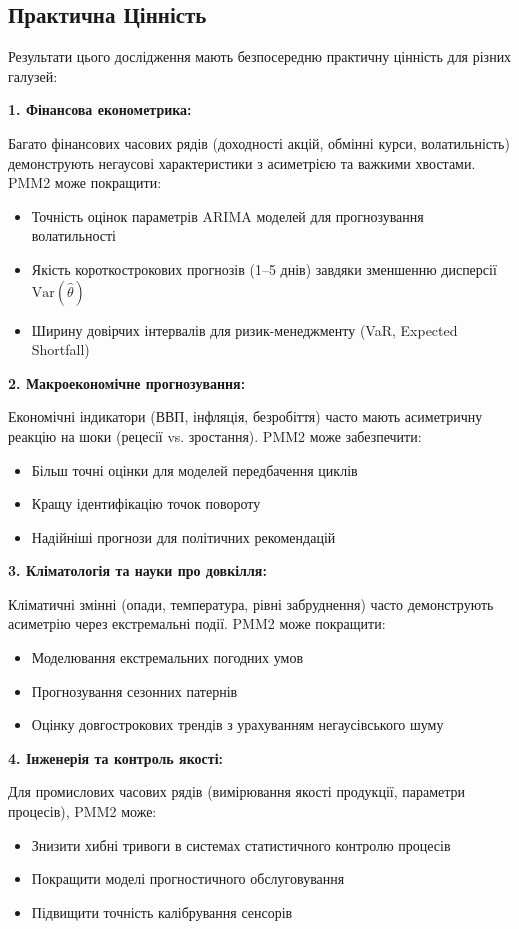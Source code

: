 \documentclass[12pt,a4paper]{article}
\begin{document}
\subsection{Практична Цінність}
\label{subsec:practical_value}

Результати цього дослідження мають безпосередню практичну цінність для різних галузей:

\textbf{1. Фінансова економетрика:}

Багато фінансових часових рядів (доходності акцій, обмінні курси, волатильність) демонструють негаусові характеристики з асиметрією та важкими хвостами. PMM2 може покращити:
\begin{itemize}
    \item Точність оцінок параметрів ARIMA моделей для прогнозування волатильності
    \item Якість короткострокових прогнозів (1--5 днів) завдяки зменшенню дисперсії $\text{Var}(\hat{\theta})$
    \item Ширину довірчих інтервалів для ризик-менеджменту (VaR, Expected Shortfall)
\end{itemize}

\textbf{2. Макроекономічне прогнозування:}

Економічні індикатори (ВВП, інфляція, безробіття) часто мають асиметричну реакцію на шоки (рецесії vs. зростання). PMM2 може забезпечити:
\begin{itemize}
    \item Більш точні оцінки для моделей передбачення циклів
    \item Кращу ідентифікацію точок повороту
    \item Надійніші прогнози для політичних рекомендацій
\end{itemize}

\textbf{3. Кліматологія та науки про довкілля:}

Кліматичні змінні (опади, температура, рівні забруднення) часто демонструють асиметрію через екстремальні події. PMM2 може покращити:
\begin{itemize}
    \item Моделювання екстремальних погодних умов
    \item Прогнозування сезонних патернів
    \item Оцінку довгострокових трендів з урахуванням негаусівського шуму
\end{itemize}

\textbf{4. Інженерія та контроль якості:}

Для промислових часових рядів (вимірювання якості продукції, параметри процесів), PMM2 може:
\begin{itemize}
    \item Знизити хибні тривоги в системах статистичного контролю процесів
    \item Покращити моделі прогностичного обслуговування
    \item Підвищити точність калібрування сенсорів
\end{itemize}
\end{document}
